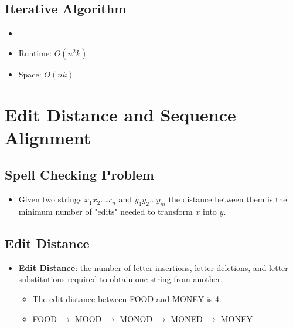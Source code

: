 \subsection{Iterative Algorithm}
\begin{itemize}
    \item[] 
    \item Runtime: $O(n^2k)$ 
    \item Space: $O(nk)$ 
\end{itemize}

\section{Edit Distance and Sequence Alignment}

\subsection{Spell Checking Problem}
\begin{itemize}
    \item Given two strings $x_1x_2...x_n$ and $y_1y_2...y_m$ the distance between them is the minimum number of "edits" needed to transform $x$ into $y$.
\end{itemize}

\subsection{Edit Distance}
\begin{itemize}
    \item \textbf{Edit Distance}: the number of letter insertions, letter deletions, and letter substitutions required to obtain one string from another.
    \begin{itemize}
        \item The edit distance between FOOD and MONEY is 4.
        \item \underline{F}OOD $\rightarrow$ MO\underline{O}D $\rightarrow$ MON\underline{O}D $\rightarrow$ MONE\underline{D} $\rightarrow$ MONEY
    \end{itemize}
\end{itemize}


